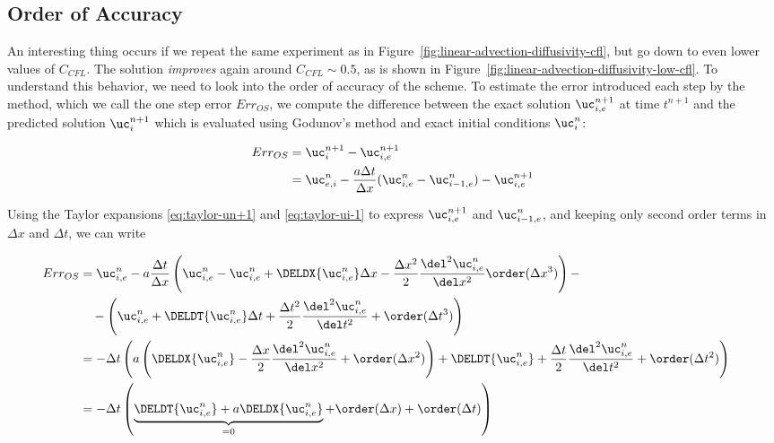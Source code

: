 \subsection{Order of Accuracy}

An interesting thing occurs if we repeat the same experiment as in
Figure~\ref{fig:linear-advection-diffusivity-cfl}, but go down to even lower values of $C_{CFL}$.
The solution \emph{improves} again around $C_{CFL} \sim 0.5$, as is shown in
Figure~\ref{fig:linear-advection-diffusivity-low-cfl}. To understand this behavior, we need to look
into the order of accuracy of the scheme. To estimate the error introduced each step by the method,
which we call the one step error $Err_{OS}$, we compute the difference between the exact solution
$\uc_{i,e}^{n+1}$ at time $t^{n+1}$ and the predicted solution $\uc_i^{n+1}$ which is evaluated
using Godunov's method and exact initial conditions $\uc_i^n$:

\begin{align}
    Err_{OS}
    &= \uc_i^{n+1} - \uc_{i,e}^{n+1}  \\
    &= \uc_{e,i}^n - \frac{a \Delta t}{\Delta x} (\uc_{i,e}^n - \uc_{i-1,e}^n) - \uc_{i,e}^{n+1}
\end{align}

Using the Taylor expansions \ref{eq:taylor-un+1} and \ref{eq:taylor-ui-1} to express
$\uc_{i,e}^{n+1}$ and $\uc_{i-1,e}^n$, and keeping only second order terms in $\Delta x$ and
$\Delta t$, we can write

\begin{align}
    Err_{OS}
    &= \uc_{i,e}^n
        - a \frac{\Delta t}{\Delta x}
        \left( \uc_{i,e}^n -
            \uc_{i,e}^n +
            \DELDX{\uc_{i,e}^n } \Delta x -
            \frac{\Delta x^2}{2} \frac{\del ^2 \uc_{i,e}^n }{\del x^2}
            \order(\Delta x^3) \right)  - &&
\\
    &\quad  - \left(
        \uc_{i,e}^n +
        \DELDT{\uc_{i,e}^n } \Delta t +
        \frac{\Delta t^2}{2} \frac{\del ^2 \uc_{i,e}^n }{\del t^2}
        + \order(\Delta t^3)  \right) && \\
    &= - \Delta t \left(
        a \left(
            \DELDX{\uc_{i,e}^n } - \frac{\Delta x}{2} \frac{\del ^2 \uc_{i,e}^n }{\del x^2} +
\order(\Delta x^2)         \right)
        + \DELDT{\uc_{i,e}^n } + \frac{\Delta t}{2} \frac{\del ^2 \uc_{i,e}^n }{\del t^2} +
\order(\Delta t^2)
    \right) \\
    &= - \Delta t \left(
        \underbrace{\DELDT{\uc_{i,e}^n } + a\DELDX{\uc_{i,e}^n }}_{= 0} + \order(\Delta x) +
\order(\Delta t)
    \right)
\end{align}

